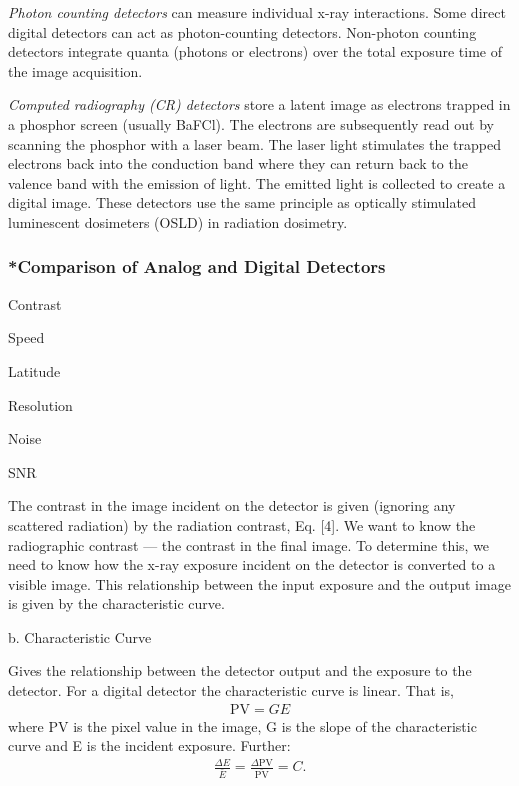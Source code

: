 \documentclass[mphy386-notes.tex]{subfiles}
\begin{document}
\textit{Photon counting detectors} can measure individual x-ray interactions.
Some direct digital detectors can act as photon-counting detectors. Non-photon
counting detectors integrate quanta (photons or electrons) over the total
exposure time of the image acquisition.

\textit{Computed radiography (CR) detectors} store a latent image as electrons
trapped in a phosphor screen (usually BaFCl). The electrons are subsequently
read out by scanning the phosphor with a laser beam. The laser light stimulates
the trapped electrons back into the conduction band where they can return back
to the valence band with the emission of light. The emitted light is collected
to create a digital image. These detectors use the same principle as optically
stimulated luminescent dosimeters (OSLD) in radiation dosimetry.

\subsubsection{*Comparison of Analog and Digital Detectors} 

Contrast

Speed

Latitude

Resolution

Noise

SNR

The contrast in the image incident on the detector is given (ignoring any
scattered radiation) by the radiation contrast, Eq. [4]. We want to
know the radiographic contrast --- the contrast in the final image. To determine
this, we need to know how the x-ray exposure incident on the detector is converted
to a visible image. This relationship between the input exposure and the output
image is given by the characteristic curve.

b. Characteristic Curve

Gives the relationship between the detector output and the exposure to the
detector. For a digital detector the characteristic curve is linear. That is,
\begin{align}
  \text{PV} = GE
\end{align}
where PV is the pixel value in the image, G is the slope of the
characteristic curve and E is the incident exposure. Further:  %
\begin{align}
  \frac{\Delta E}{\bar{E}} = \frac{\Delta \text{PV}}{\bar{\text{PV}}} = C.
\end{align}
\end{document}
